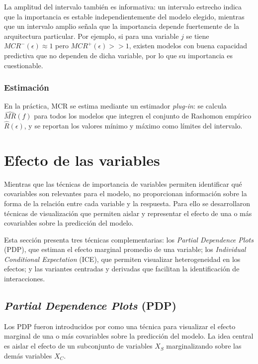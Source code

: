 La amplitud del intervalo también es informativa: un intervalo estrecho indica que la importancia es estable independientemente del modelo elegido, mientras que un intervalo amplio señala que la importancia depende fuertemente de la arquitectura particular. Por ejemplo, si para una variable $j$ se tiene $MCR^{-}(\epsilon) \approx 1$ pero $MCR^{+}(\epsilon) >> 1$, existen modelos con buena capacidad predictiva que no dependen de dicha variable, por lo que su importancia es cuestionable.

\subsubsection{Estimación}
En la práctica, MCR se estima mediante un estimador \textit{plug-in}: se calcula $\hat{MR}(f)$ para todos los modelos que integren el conjunto de Rashomon empírico $\hat{R}(\epsilon)$, y se reportan los valores mínimo y máximo como límites del intervalo.

\section{Efecto de las variables}

Mientras que las técnicas de importancia de variables permiten identificar qué covariables son relevantes para el modelo, no proporcionan información sobre la forma de la relación entre cada variable y la respuesta. Para ello se desarrollaron técnicas de visualización que permiten aislar y representar el efecto de una o más covariables sobre la predicción del modelo.

Esta sección presenta tres técnicas complementarias: los \textit{Partial Dependence Plots} (PDP), que estiman el efecto marginal promedio de una variable; los \textit{Individual Conditional Expectation} (ICE), que permiten visualizar heterogeneidad en los efectos; y las variantes centradas y derivadas que facilitan la identificación de interacciones.

\subsection{\textit{Partial Dependence Plots} (PDP)}
Los PDP fueron introducidos por \cite{friedman_2001} como una técnica para visualizar el efecto marginal de una o más covariables sobre la predicción del modelo. La idea central es aislar el efecto de un subconjunto de variables $X_S$ marginalizando sobre las demás variables $X_C$.

